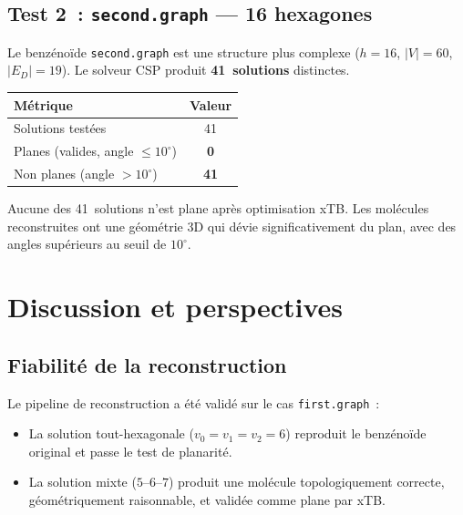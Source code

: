 \documentclass[12pt,a4paper]{article}
\theoremstyle{definition}
\theoremstyle{remark}
\newcommand{\ED}{E_{\!D}}
\begin{document}
\subsection{Test 2~: \texttt{second.graph} --- 16 hexagones}

Le benz\'eno\"ide \texttt{second.graph} est une structure plus complexe
($h = 16$, $|V| = 60$, $|\ED| = 19$). Le solveur CSP produit
\textbf{41~solutions} distinctes.

\begin{center}
\begin{tabular}{lc}
\toprule
\textbf{M\'etrique} & \textbf{Valeur} \\
\midrule
Solutions test\'ees & 41 \\
Planes (valides, angle $\leq 10^\circ$) & \textcolor{rougeAlert}{\textbf{0}} \\
Non planes (angle $> 10^\circ$) & \textcolor{rougeAlert}{\textbf{41}} \\
\bottomrule
\end{tabular}
\end{center}

\begin{alertbox}
Aucune des 41~solutions n'est plane apr\`es optimisation xTB. Les
mol\'ecules reconstruites ont une g\'eom\'etrie 3D qui d\'evie
significativement du plan, avec des angles sup\'erieurs au seuil de
$10^\circ$.
\end{alertbox}


\section{Discussion et perspectives}

\subsection{Fiabilit\'e de la reconstruction}

Le pipeline de reconstruction a \'et\'e valid\'e sur le cas
\texttt{first.graph}~:
\begin{itemize}[nosep]
  \item La solution tout-hexagonale ($v_0 = v_1 = v_2 = 6$) reproduit
        le benz\'eno\"ide original et passe le test de planarit\'e.
  \item La solution mixte ($5$--$6$--$7$) produit une mol\'ecule
        topologiquement correcte, g\'eom\'etriquement raisonnable, et
        valid\'ee comme plane par xTB.
\end{itemize}
\end{document}
